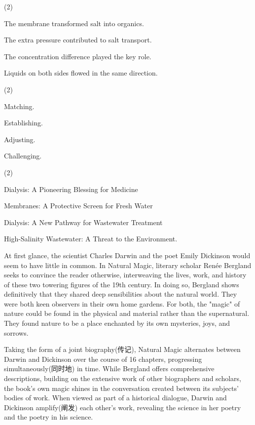 \documentclass{英语试卷}
\begin{document}
\begin{choices}(2)
  \item The membrane transformed salt into organics.
  \item The extra pressure contributed to salt transport.
  \item The concentration difference played the key role.
  \item Liquids on both sides flowed in the same direction.
\end{choices}
\begin{choices}(2)
  \item Matching.
  \item Establishing.
  \item Adjusting.
  \item Challenging.
\end{choices}
\begin{choices}(2)
  \item Dialysis: A Pioneering Blessing for Medicine
  \item Membranes: A Protective Screen for Fresh Water
  \item Dialysis: A New Pathway for Wastewater Treatment
  \item High-Salinity Wastewater: A Threat to the Environment.
\end{choices}
\par At first glance, the scientist Charles Darwin and the poet Emily Dickinson would seem to have little in common. In Natural Magic, literary scholar Renée Bergland seeks to convince the reader otherwise, interweaving the lives, work, and history of these two towering figures of the 19th century. In doing so, Bergland shows definitively that they shared deep sensibilities about the natural world. They were both keen observers in their own home gardens. For both, the "magic" of nature could be found in the physical and material rather than the supernatural. They found nature to be a place enchanted by its own mysteries, joys, and sorrows.\par
\par Taking the form of a joint biography(传记), Natural Magic alternates between Darwin and Dickinson over the course of 16 chapters, progressing simultaneously(同时地) in time. While Bergland offers comprehensive descriptions, building on the extensive work of other biographers and scholars, the book's own magic shines in the conversation created between its subjects' bodies of work. When viewed as part of a historical dialogue, Darwin and Dickinson amplify(阐发) each other's work, revealing the science in her poetry and the poetry in his science.\par
\end{document}
